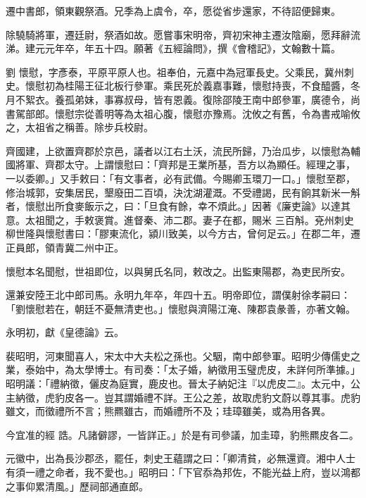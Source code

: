 \begin{pinyinscope}
 遷中書郎，領東觀祭酒。兄季為上虞令，卒，愿從省步還家，不待詔便歸東。



 除驍騎將軍，遷廷尉，祭酒如故。愿嘗事宋明帝，齊初宋神主遷汝陰廟，愿拜辭流涕。建元元年卒，年五十四。願著《五經論問》，撰《會稽記》，文翰數十篇。



 劉
 懷慰，字彥泰，平原平原人也。祖奉伯，元嘉中為冠軍長史。父乘民，冀州刺史。懷慰初為桂陽王征北板行參軍。乘民死於義嘉事難，懷慰持喪，不食醯醬，冬月不絮衣。養孤弟妹，事寡叔母，皆有恩義。復除邵陵王南中郎參軍，廣德令，尚書駕部郎。懷慰宗從善明等為太祖心腹，懷慰亦豫焉。沈攸之有舊，令為書戒喻攸之，太祖省之稱善。除步兵校尉。



 齊國建，上欲置齊郡於京邑，議者以江右土沃，流民所歸，乃治瓜步，以懷慰為輔國將軍、齊郡太守。上謂懷慰曰：「齊邦是王業所基，吾方以為顯任。經理之事，一以委卿。」又手敕曰：「有文事者，必有武備。今賜卿玉環刀一口。」懷慰至郡，修治城郭，安集居民，墾廢田二百頃，決沈湖灌溉。不受禮謁，民有餉其新米一斛者，懷慰出所食麥飯示之，曰：「旦食有餘，幸不煩此。」因著《廉吏論》以達其意。太祖聞之，手敕褒賞。進督秦、沛二郡。妻子在都，賜米
 三百斛。兗州刺史柳世隆與懷慰書曰：「膠東流化，潁川致美，以今方古，曾何足云。」在郡二年，遷正員郎，領青冀二州中正。



 懷慰本名聞慰，世祖即位，以與舅氏名同，敕改之。出監東陽郡，為吏民所安。



 還兼安陸王北中郎司馬。永明九年卒，年四十五。明帝即位，謂僕射徐孝嗣曰：「劉懷慰若在，朝廷不憂無清吏也。」懷慰與濟陽江淹、陳郡袁彖善，亦著文翰。



 永明初，獻《皇德論》云。



 裴昭明，河東聞喜人，宋太中大夫松之孫也。父駰，南中郎參軍。昭明少傳儒史之業，泰始中，為太學博士。有司奏：「太子婚，納徵用玉璧虎皮，未詳何所準據。」昭明議：「禮納徵，儷皮為庭實，鹿皮也。晉太子納妃注『以虎皮二』。太元中，公主納徵，虎豹皮各一。豈其謂婚禮不詳。王公之差，故取虎豹文蔚以尊其事。虎豹雖文，而徵禮所不言；熊羆雖古，而婚禮所不及；珪璋雖美，或為用各異。



 今宜准的經
 誥。凡諸僻謬，一皆詳正。」於是有司參議，加圭璋，豹熊羆皮各二。



 元徽中，出為長沙郡丞，罷任，刺史王蘊謂之曰：「卿清貧，必無還資。湘中人士有須一禮之命者，我不愛也。」昭明曰：「下官忝為邦佐，不能光益上府，豈以鴻都之事仰累清風。」歷祠部通直郎。




\end{pinyinscope}
